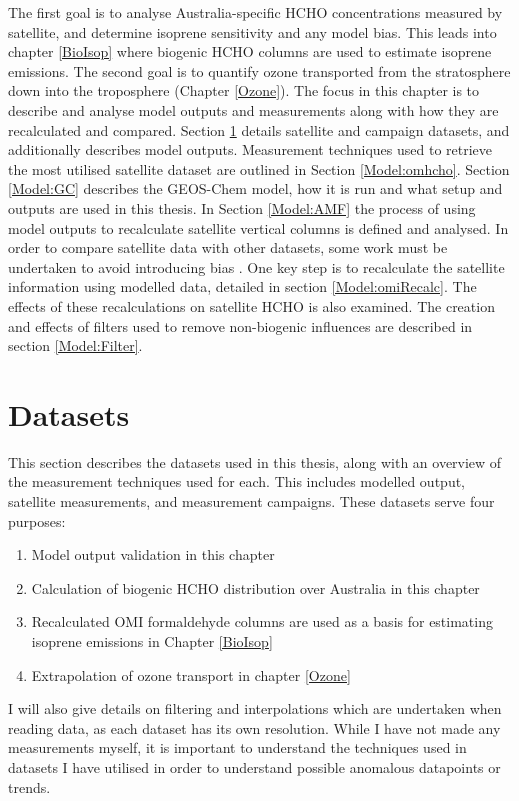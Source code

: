   The first goal is to analyse Australia-specific HCHO concentrations measured by satellite, and determine isoprene sensitivity and any model bias.
  This leads into chapter \ref{BioIsop} where biogenic HCHO columns are used to estimate isoprene emissions.
  The second goal is to quantify ozone transported from the stratosphere down into the troposphere (Chapter \ref{Ozone}).
  The focus in this chapter is to describe and analyse model outputs and measurements along with how they are recalculated and compared.
  Section \ref{Model:Datasets} details satellite and campaign datasets, and additionally describes model outputs.
  Measurement techniques used to retrieve the most utilised satellite dataset are outlined in Section \ref{Model:omhcho}.
  Section \ref{Model:GC} describes the GEOS-Chem model, how it is run and what setup and outputs are used in this thesis.
  In Section \ref{Model:AMF} the process of using model outputs to recalculate satellite vertical columns is defined and analysed.
  In order to compare satellite data with other datasets, some work must be undertaken to avoid introducing bias \parencite[eg.][]{Palmer2001, Eskes2003, Marais2012, Lamsal2014}.
  One key step is to recalculate the satellite information using modelled data, detailed in section \ref{Model:omiRecalc}.
  The effects of these recalculations on satellite HCHO is also examined.
  The creation and effects of filters used to remove non-biogenic influences are described in section \ref{Model:Filter}.
  
  

\section{Datasets}
  \label{Model:Datasets}
  
  This section describes the datasets used in this thesis, along with an overview of the measurement techniques used for each.
  This includes modelled output, satellite measurements, and measurement campaigns.
  These datasets serve four purposes: 
  \begin{enumerate}
    \item Model output validation in this chapter
    \item Calculation of biogenic HCHO distribution over Australia in this chapter
    \item Recalculated OMI formaldehyde columns are used as a basis for estimating isoprene emissions in Chapter \ref{BioIsop}
    \item Extrapolation of ozone transport in chapter \ref{Ozone}
  \end{enumerate}
  I will also give details on filtering and interpolations which are undertaken when reading data, as each dataset has its own resolution.
  While I have not made any measurements myself, it is important to understand the techniques used in datasets I have utilised in order to understand possible anomalous datapoints or trends.
  
